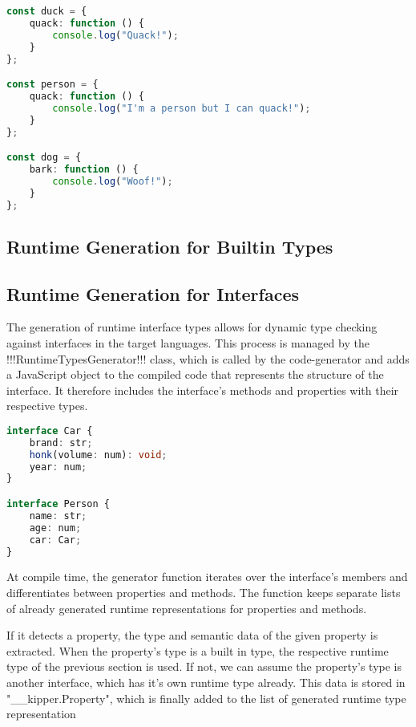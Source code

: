\begin{lstlisting}[language=Typescript,caption=Example of duck typing in JavaScript,label=lst:implementation:javascriptducktyping]
const duck = {
	quack: function () {
		console.log("Quack!");
	}
};

const person = {
	quack: function () {
		console.log("I'm a person but I can quack!");
	}
};

const dog = {
	bark: function () {
		console.log("Woof!");
	}
};
\end{lstlisting}

\subsection{Runtime Generation for Builtin Types}

\subsection{Runtime Generation for Interfaces}
The generation of runtime interface types allows for dynamic type checking against interfaces in the target languages. This process is managed by the !!!RuntimeTypesGenerator!!! class, which is called by the code-generator and adds a JavaScript object to the compiled code that represents the structure of the interface. It therefore includes the interface's methods and properties with their respective types.

\begin{lstlisting}[language=Typescript,caption=Example interfaces in the Kipper language,label=lst:implementation:inputinterface]
interface Car {
	brand: str;
	honk(volume: num): void;
	year: num;
}

interface Person {
	name: str;
	age: num;
	car: Car;
}
\end{lstlisting}

 At compile time, the generator function iterates over the interface's members and differentiates between properties and methods. The function keeps separate lists of already generated runtime representations for properties and methods.
 
 If it detects a property, the type and semantic data of the given property is extracted. When the property's type is a built in type, the respective runtime type of the previous section is used. If not, we can assume the property's type is another interface, which has it's own runtime type already. This data is stored in "\_\_kipper.Property", which is finally added to the list of generated runtime type representation
 

